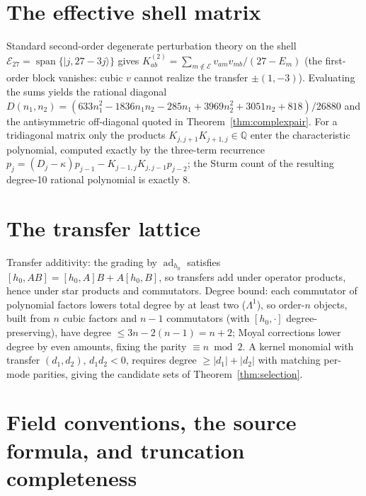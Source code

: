 \documentclass[11pt]{article}
\theoremstyle{definition}
\theoremstyle{remark}
\newcommand{\ad}{\operatorname{ad}}
\begin{document}
\section{The effective shell matrix}\label{app:shell}

Standard second-order degenerate perturbation theory on the shell
$\mathcal E_{27}=\operatorname{span}\{|j,27-3j\rangle\}$ gives
$K^{(2)}_{ab}=\sum_{m\notin\mathcal E}v_{am}v_{mb}/(27-E_m)$ (the
first-order block vanishes: cubic $v$ cannot realize the transfer
$\pm(1,-3)$).  Evaluating the sums yields the rational diagonal
$D(n_1,n_2)=(633n_1^2-1836n_1n_2-285n_1+3969n_2^2+3051n_2+818)/26880$
and the antisymmetric off-diagonal quoted in
Theorem~\ref{thm:complexpair}.  For a tridiagonal matrix only the
products $K_{j,j+1}K_{j+1,j}\in\mathbb Q$ enter the characteristic
polynomial, computed exactly by the three-term recurrence
$p_j=(D_j-\kappa)p_{j-1}-K_{j-1,j}K_{j,j-1}p_{j-2}$; the Sturm count of
the resulting degree-10 rational polynomial is exactly 8.

\section{The transfer lattice}\label{app:lattice}

Transfer additivity: the grading by $\ad_{h_0}$ satisfies
$[h_0,AB]=[h_0,A]B+A[h_0,B]$, so transfers add under operator products,
hence under star products and commutators.  Degree bound: each
commutator of polynomial factors lowers total degree by at least two
($\Lambda^1$), so order-$n$ objects, built from $n$ cubic factors and
$n-1$ commutators (with $[h_0,\cdot]$ degree-preserving), have degree
$\le3n-2(n-1)=n+2$; Moyal corrections lower degree by even amounts,
fixing the parity $\equiv n\bmod2$.  A kernel monomial with transfer
$(d_1,d_2)$, $d_1d_2<0$, requires degree $\ge|d_1|+|d_2|$ with matching
per-mode parities, giving the candidate sets of
Theorem~\ref{thm:selection}.

\section{Field conventions, the source formula, and truncation
completeness}\label{app:field}
\end{document}
